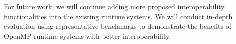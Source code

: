 For future work, we will continue adding more proposed interoperability functionalities into the existing runtime systems. We will conduct in-depth evaluation using representative benchmarks to demonstrate the benefits of OpenMP runtime systems with better interoperability. 
